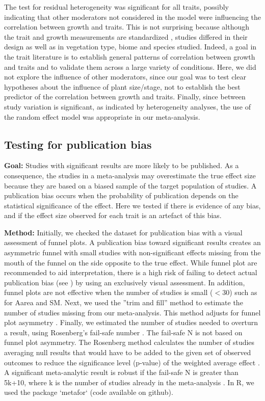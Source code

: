 \documentclass[a4paper,11pt]{article}
\begin{document}
\begin{appendices}
The test for residual heterogeneity was significant for all traits, possibly indicating that other moderators not considered in the model were influencing the correlation between growth and traits. This is not surprising because although the trait and growth measurements are standardized \citep{Cornelissen:2003gw}, studies differed in their design as well as in vegetation type, biome and species studied. Indeed, a goal in the trait literature is to establish general patterns of correlation between growth and traits and to validate them across a large variety of conditions. Here, we did not explore the influence of other moderators, since our goal was to test clear hypotheses about the influence of plant size/stage, not to establish the best predictor of the correlation between growth and traits. Finally, since between study variation is significant, as indicated by heterogeneity analyses, the use of the random effect model was appropriate in our meta-analysis.

\subsection{Testing for publication bias}
\textbf{Goal:} Studies with significant results are more likely to be published. As a consequence, the studies in a meta-analysis may overestimate the true effect size because they are based on a biased sample of the target population of studies. A publication bias occurs when the probability of publication depends on the statistical significance of the effect. Here we tested if there is evidence of any bias, and if the effect size observed for each trait is an artefact of this bias.

\textbf{Method:} Initially, we checked the dataset for publication bias with a visual assessment of funnel plots. A publication bias toward significant results creates an asymmetric funnel with small studies with non-significant effects missing from the mouth of the funnel on the side opposite to the true effect. While funnel plot are recommended to aid interpretation, there is a high risk of failing to detect actual publication bias (see \citealt{Koricheva:2013tz}) by using an exclusively visual assessment. In addition, funnel plots are not effective when the number of studies is small ($<30$) such as for Aarea and SM.
Next, we used the ''trim and fill'' method to estimate the number of studies missing from our meta-analysis. This method adjusts for funnel plot asymmetry \citep{Duval:2000dg}.
Finally, we estimated the number of studies needed to overturn a result, using Rosenberg’s fail-safe number \citep{Rosenberg:2005hk}. The fail-safe N is not based on funnel plot asymmetry. The Rosenberg method calculates the number of studies averaging null results that would have to be added to the given set of observed outcomes to reduce the significance level (p-value) of the weighted average effect \citep{Rosenberg:2005hk}. A significant meta-analytic result is robust if the fail-safe N is greater than 5k+10, where k is the number of studies already in the meta-analysis \citep{Rosenthal:1979do}.
In R, we used the package `metafor` (code available on github).


\end{appendices}
\end{document}
